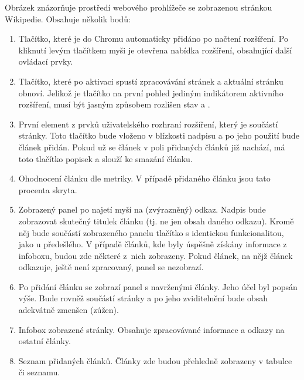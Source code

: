 Obrázek znázorňuje prostředí webového prohlížeče se zobrazenou stránkou Wikipedie. Obsahuje několik bodů:

\begin{enumerate}
	\item Tlačítko, které je do Chromu automaticky přidáno po načtení rozšíření. Po kliknutí levým tlačítkem myši je otevřena nabídka rozšíření, obsahující další ovládací prvky.
	\item Tlačítko, které po aktivaci spustí zpracovávání stránek a aktuální stránku obnoví. Jelikož je tlačítko na první pohled jediným indikátorem aktivního rozšíření, musí být jasným způsobem rozlišen stav  a .
	\item První element z prvků uživatelského rozhraní rozšíření, který je součástí stránky. Toto tlačítko bude vloženo v blízkosti nadpisu a po jeho použití bude článek přidán. Pokud už se článek v poli přidaných článků již nachází, má toto tlačítko popisek  a slouží ke smazání článku.
	\item Ohodnocení článku dle metriky. V případě přidaného článku jsou tato procenta skryta.
	\item Zobrazený panel po najetí myší na (zvýrazněný) odkaz. Nadpis bude zobrazovat skutečný titulek článku (tj. ne jen obsah daného odkazu). Kromě něj bude součástí zobrazeného panelu tlačítko s identickou funkcionalitou, jako u předešlého. V případě článků, kde byly úspěšně získány informace z infoboxu, budou zde některé z~nich zobrazeny. Pokud článek, na nějž článek odkazuje, ještě není zpracovaný, panel se nezobrazí.
	\item Po přidání článku se zobrazí panel s navrženými články. Jeho účel byl popsán výše. Bude rovněž součástí stránky a po jeho zviditelnění bude obsah adekvátně zmenšen (zúžen).
	\item Infobox zobrazené stránky. Obsahuje zpracovávané informace a odkazy na ostatní články.
	\item Seznam přidaných článků. Články zde budou přehledně zobrazeny v tabulce či seznamu.
\end{enumerate} 
 
 
